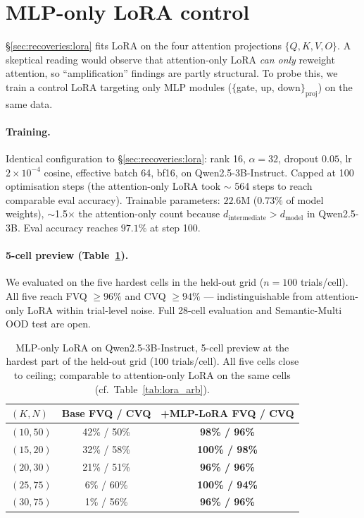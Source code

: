 \documentclass[11pt]{article}
\begin{document}
\section{MLP-only LoRA control}
\label{app:mlp_lora}

\S\ref{sec:recoveries:lora} fits LoRA on the four attention
projections $\{Q, K, V, O\}$. A skeptical reading would observe
that attention-only LoRA \emph{can only} reweight attention, so
``amplification'' findings are partly structural. To probe this,
we train a control LoRA targeting only MLP modules
($\{$gate, up, down$\}_{\text{proj}}$) on the same data.

\paragraph{Training.}
Identical configuration to \S\ref{sec:recoveries:lora}: rank 16,
$\alpha {=} 32$, dropout $0.05$, lr $2 \times 10^{-4}$ cosine,
effective batch 64, bf16, on Qwen2.5-3B-Instruct. Capped at 100
optimisation steps (the attention-only LoRA took $\sim$ 564 steps
to reach comparable eval accuracy). Trainable parameters: $22.6$M
($0.73\%$ of model weights), $\sim$1.5$\times$ the attention-only
count because $d_{\mathrm{intermediate}} > d_{\mathrm{model}}$ in
Qwen2.5-3B. Eval accuracy reaches $97.1\%$ at step 100.

\paragraph{5-cell preview (Table~\ref{tab:mlp_lora}).}
We evaluated on the five hardest cells in the held-out grid
($n=100$ trials/cell). All five reach FVQ $\ge 96\%$ and
CVQ $\ge 94\%$ --- indistinguishable from attention-only LoRA
within trial-level noise. Full 28-cell evaluation and
Semantic-Multi OOD test are open.

\begin{table}[!htbp]
\centering
\footnotesize
\setlength{\tabcolsep}{4pt}
\begin{tabular}{lcc}
\toprule
$(K, N)$ & \textbf{Base FVQ / CVQ} & \textbf{+MLP-LoRA FVQ / CVQ} \\
\midrule
$(10, 50)$ & 42\% / 50\% & \textbf{98\% / 96\%} \\
$(15, 20)$ & 32\% / 58\% & \textbf{100\% / 98\%} \\
$(20, 30)$ & 21\% / 51\% & \textbf{96\% / 96\%} \\
$(25, 75)$ &  6\% / 60\% & \textbf{100\% / 94\%} \\
$(30, 75)$ &  1\% / 56\% & \textbf{96\% / 96\%} \\
\bottomrule
\end{tabular}
\caption{MLP-only LoRA on Qwen2.5-3B-Instruct, 5-cell preview at
the hardest part of the held-out grid (100 trials/cell). All five
cells close to ceiling; comparable to attention-only LoRA on the
same cells (cf.\ Table~\ref{tab:lora_arb}).}
\label{tab:mlp_lora}
\end{table}
\end{document}
